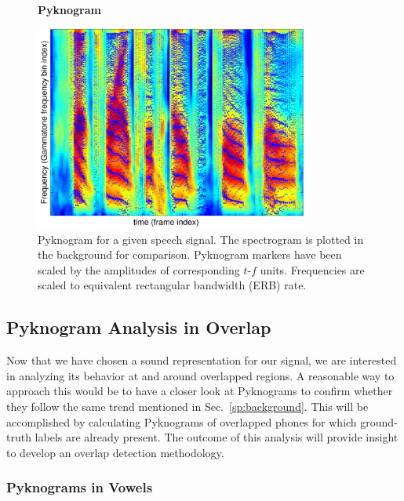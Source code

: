 {\begin{figure}[h!]
	\centering
	\vspace{4mm}
	\textbf{Pyknogram}\par\medskip
	\includegraphics[height =3.in, width=0.8\textwidth]{figures/pyknogram_vs_spectrogram}
	\vspace{-1mm}
	\caption{Pyknogram for a given speech signal. The spectrogram is plotted in the background for comparison. Pyknogram markers have been scaled by the amplitudes of corresponding $t$-$f$ units. Frequencies are scaled to equivalent rectangular bandwidth (ERB) rate.}
	\vspace{-1mm}
	\label{fig:pyknograms}
\end{figure}


\subsection{Pyknogram Analysis in Overlap}

Now that we have chosen a sound representation for our signal, we are interested in analyzing its behavior at and around overlapped regions. 
A reasonable way to approach this would be to have a closer look at Pyknograms to confirm whether they follow the same trend mentioned in Sec.~\ref{sp:background}. 
This will be accomplished by calculating Pyknograms of overlapped phones for which ground-truth labels are already present. 
The outcome of this analysis will provide insight to develop an overlap detection methodology. 

\subsubsection{Pyknograms in Vowels}

}
